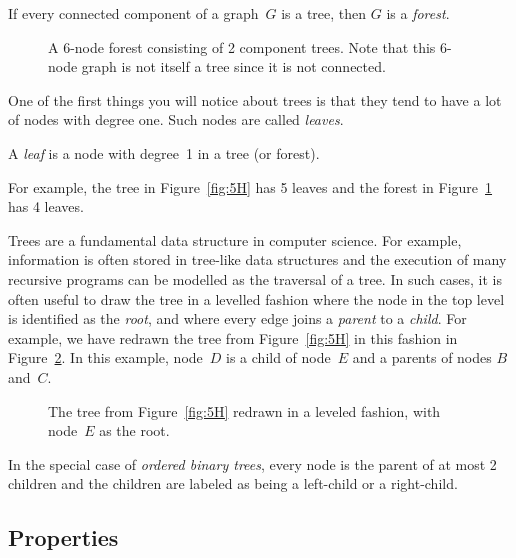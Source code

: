 \begin{definition}\label{def:forest}
If every connected component of a graph~$G$ is a tree, then $G$ is a
\emph{forest}.
\end{definition}

\begin{figure}

\missinggraphic

\caption{A 6-node forest consisting of 2 component trees.  Note that
  this 6-node graph is not itself a tree since it is not connected.}
\label{fig:5I}
\end{figure}

One of the first things you will notice about trees is that they tend
to have a lot of nodes with degree one.  Such nodes are called
\emph{leaves}.

\begin{definition}
A \emph{leaf} is a node with degree~1 in a tree (or forest).
\end{definition}

For example, the tree in Figure~\ref{fig:5H} has 5 leaves and the
forest in Figure~\ref{fig:5I} has 4 leaves.

Trees are a fundamental data structure in computer science.  For
example, information is often stored in tree-like data structures and
the execution of many recursive programs can be modelled as the
traversal of a tree.  In such cases, it is often useful to draw the
tree in a levelled fashion where the node in the top level is
identified as the \emph{root}, and where every edge joins a
\emph{parent} to a \emph{child}.  For example, we have redrawn the
tree from Figure~\ref{fig:5H} in this fashion in Figure~\ref{fig:5JJ}.
In this example, node~$D$ is a child of node~$E$ and a parents of
nodes $B$ and~$C$.

\begin{figure}

\missinggraphic

\caption{The tree from Figure~\ref{fig:5H} redrawn in a leveled
  fashion, with node~$E$ as the root.}

\label{fig:5JJ}
\end{figure}

In the special case of \emph{ordered binary trees}, every node is the
parent of at most 2 children and the children are labeled as being a
left-child or a right-child.

\subsection{Properties}

